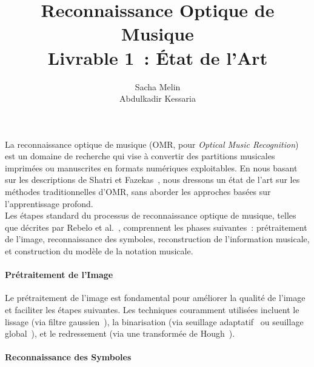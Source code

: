 \documentclass[a4paper,10pt]{article}
\title{\vspace{-1.5cm}\textbf{Reconnaissance Optique de Musique \\ \large Livrable 1~: État de l'Art}}
\author{Sacha Melin \\ Abdulkadir Kessaria}
\date{}
\begin{document}
\maketitle

La reconnaissance optique de musique (OMR, pour \textit{Optical Music Recognition}) est un domaine de recherche qui vise à convertir des partitions musicales imprimées ou manuscrites en formats numériques exploitables. En nous basant sur les descriptions de Shatri et Fazekas~\cite{shatri2020opticalmusicrecognitionstate}, nous dressons un état de l'art sur les méthodes traditionnelles d'OMR, sans aborder les approches basées sur l'apprentissage profond. \\

Les étapes standard du processus de reconnaissance optique de musique, telles que décrites par Rebelo et al.~\cite{Rebelo2012-jn}, comprennent les phases suivantes~: prétraitement de l'image, reconnaissance des symboles, reconstruction de l'information musicale, et construction du modèle de la notation musicale.

\paragraph{Prétraitement de l'Image}

Le prétraitement de l'image est fondamental pour améliorer la qualité de l'image et faciliter les étapes suivantes. Les techniques couramment utilisées incluent le lissage (via filtre gaussien~\cite{gocke2003building}), la binarisation (via seuillage adaptatif~\cite{gocke2003building} ou seuillage global~\cite{4310039}), et le redressement (via une transformée de Hough~\cite{BALLARD1981111}).

\paragraph{Reconnaissance des Symboles}
\end{document}
